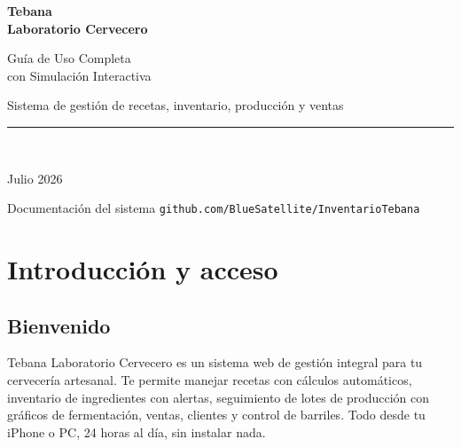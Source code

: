 \documentclass[11pt,a4paper]{report}
\begin{document}
\begin{titlepage}
\centering
\vspace*{3cm}

{\Huge\bfseries\color{dark} Tebana\\[4pt] Laboratorio Cervecero\par}
\vspace{1cm}
{\Large\color{beer} Guía de Uso Completa\\[4pt] con Simulación Interactiva\par}
\vspace{0.5cm}
{\normalsize\color{black!50} Sistema de gestión de recetas, inventario, producción y ventas\par}

\vspace{2.5cm}

{\color{beer}\rule{10cm}{1.5pt}}

\vspace{1cm}

{\large\faBeer\ \faFlask\ \faBeer}

\vspace{1.5cm}

{\large\color{dark} Julio 2026\par}

\vspace{1cm}
{\small\color{black!40} Documentación del sistema \texttt{github.com/BlueSatellite/InventarioTebana}\par}
\end{titlepage}

\tableofcontents
\newpage

\chapter{Introducción y acceso}

\section{Bienvenido}
Tebana Laboratorio Cervecero es un sistema web de gestión integral para tu cervecería artesanal. Te permite manejar recetas con cálculos automáticos, inventario de ingredientes con alertas, seguimiento de lotes de producción con gráficos de fermentación, ventas, clientes y control de barriles. Todo desde tu iPhone o PC, 24 horas al día, sin instalar nada.
\end{document}
